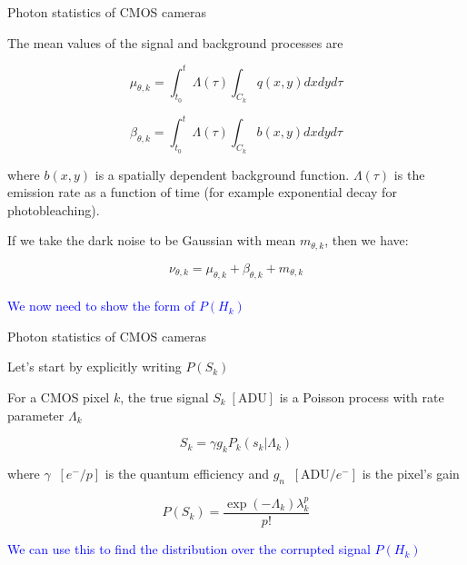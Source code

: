 \documentclass[aspectratio=1610]{beamer}					%
\begin{document}
\begin{frame}{Photon statistics of CMOS cameras}

The mean values of the signal and background processes are

\begin{equation*}
\mu_{\theta,k} = \int_{t_{0}}^{t} \Lambda(\tau) \int_{C_{k}} q(x,y)dxdyd\tau
\end{equation*}

\begin{equation*}
\beta_{\theta,k} = \int_{t_{0}}^{t} \Lambda(\tau) \int_{C_{k}} b(x,y)dxdyd\tau
\end{equation*}

where $b(x,y)$ is a spatially dependent background function. $\Lambda(\tau)$ is the emission rate as a function of time (for example exponential decay for photobleaching). 

If we take the dark noise to be Gaussian with mean $m_{\theta,k}$, then we have: 

\begin{equation*}
\nu_{\theta,k} = \mu_{\theta,k} + \beta_{\theta,k} + m_{\theta,k}
\end{equation*}
\\
\vspace{0.2in}
\textcolor{blue}{We now need to show the form of $P(H_{k})$}


\end{frame}

\begin{frame}{Photon statistics of CMOS cameras}

Let's start by explicitly writing $P(S_{k})$

\vspace{0.2in}
For a CMOS pixel $k$, the true signal $S_{k}\; [\mathrm{ADU}]$ is a Poisson process with rate parameter $\Lambda_{k}$

\begin{equation*}
S_{k} = \gamma g_{k}P_{k}(s_{k}|\Lambda_{k})
\end{equation*}

where $\gamma\;\;[e^{-}/p]$ is the quantum efficiency and $g_{n}\;\; [\mathrm{ADU}/e^{-}]$ is the pixel's gain
\vspace{0.1in}

\begin{equation*}
P(S_{k}) = \frac{\exp\left({-\Lambda_{k}}\right)\lambda_{k}^{p}}{p!}
\end{equation*}

\textcolor{blue}{We can use this to find the distribution over the corrupted signal $P(H_{k})$}


\end{frame}
\end{document}
